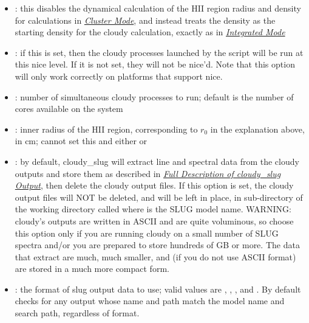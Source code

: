 \documentclass[letterpaper,10pt,english]{sphinxmanual}
\begin{document}
\begin{itemize}
\item {} 
: this disables the dynamical calculation of the
HII region radius and density for calculations in
{\hyperref[cloudy:sssec\string-cloudy\string-cluster\string-mode]{\emph{Cluster Mode}}}, and instead treats the density as
the starting density for the cloudy calculation, exactly as in
{\hyperref[cloudy:sssec\string-cloudy\string-integrated\string-mode]{\emph{Integrated Mode}}}

\item {} 
: if this is set, then the
cloudy processes launched by the script will be run at this nice
level. If it is not set, they will not be nice'd. Note that this
option will only work correctly on platforms that support nice.

\item {} 
: number of simultaneous cloudy processes
to run; default is the number of cores available on the system

\item {} 
: inner radius of the HII region,
corresponding to \(r_0\) in the explanation above, in
cm; cannot set this and either  or 

\item {} 
: by default, cloudy\_slug will extract line and
spectral data from the cloudy outputs and store them as described in
{\hyperref[cloudy:ssec\string-cloudy\string-output]{\emph{Full Description of cloudy\_slug Output}}}, then delete the cloudy output files. If
this option is set, the cloudy output files will NOT be deleted, and
will be left in place, in sub-directory of the working directory
called  where  is the SLUG model
name. WARNING: cloudy's outputs are written in ASCII and are quite
voluminous, so choose this option only if you are running
cloudy on a small number of SLUG spectra and/or you are prepared to
store hundreds of GB or more. The data that  extract
are much, much smaller, and (if you do not use ASCII format) are
stored in a much more compact form.

\item {} 
: the format of slug output data to use;
valid values are , , , and . By
default  checks for any output whose name and path
match the model name and search path, regardless of format.


\end{itemize}
\end{document}
